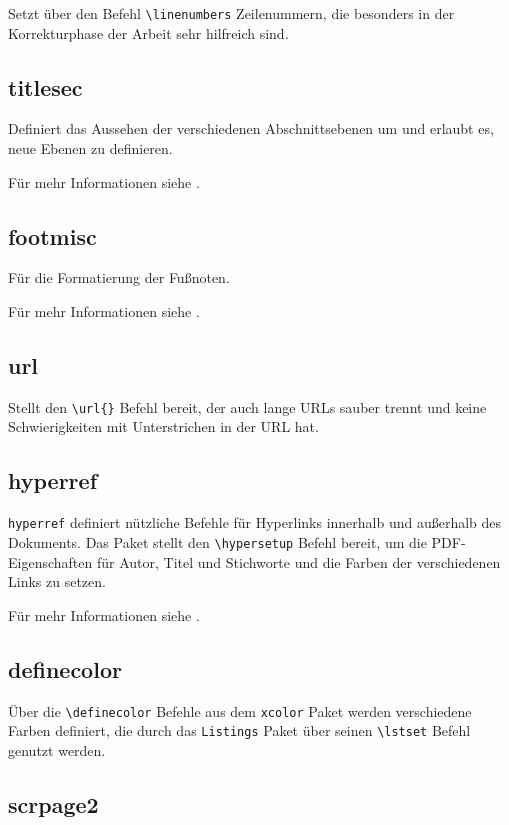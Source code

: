 Setzt über den Befehl \verb|\linenumbers| Zeilenummern, die besonders in der Korrekturphase der Arbeit sehr hilfreich sind.

\subsection{titlesec}

Definiert das Aussehen der verschiedenen Abschnittsebenen um und erlaubt es, neue Ebenen zu definieren.

Für mehr Informationen siehe \cite{titlesec}. 

\subsection{footmisc}

Für die Formatierung der Fußnoten.

Für mehr Informationen siehe \cite{footmisc}.

\subsection{url}

Stellt den \verb|\url{}| Befehl bereit, der auch lange URLs sauber trennt und keine Schwierigkeiten mit Unterstrichen in der URL hat.

\subsection{hyperref}

\texttt{hyperref} definiert nützliche Befehle für Hyperlinks innerhalb und außerhalb des Dokuments. Das Paket stellt den \verb|\hypersetup| Befehl bereit, um die PDF-Eigenschaften für Autor, Titel und Stichworte und die Farben der verschiedenen Links zu setzen. 

Für mehr Informationen siehe \cite{hyperref}.

\subsection{definecolor}

Über die \verb|\definecolor| Befehle aus dem \texttt{xcolor} Paket werden verschiedene Farben definiert, die durch das \texttt{Listings} Paket über seinen \verb|\lstset| Befehl genutzt werden.

\subsection{scrpage2}

